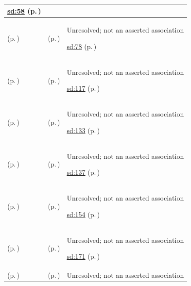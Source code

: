 \begin{longtable}{|>{\raggedright\arraybackslash}p{0.27\TableWidth}|>{\raggedright\arraybackslash}p{0.27\TableWidth}|>{\raggedright\arraybackslash}p{0.46\TableWidth}|}
 \hyperref[rad:sd:51]{sd:58} (p.\,\pageref{rad:sd:51})\\\hline
\nameref{function:route-acute-critical-result-alert} (p.\,\pageref{function:route-acute-critical-result-alert}) & \nameref{feature:feat-sd-03} (p.\,\pageref{feature:feat-sd-03}) & Unresolved; not an asserted association

 \hyperref[rad:sd:71]{sd:78} (p.\,\pageref{rad:sd:71})\\\hline
\nameref{function:assemble-inpatient-discharge-dossier} (p.\,\pageref{function:assemble-inpatient-discharge-dossier}) & \nameref{feature:feat-sd-08} (p.\,\pageref{feature:feat-sd-08}) & Unresolved; not an asserted association

 \hyperref[rad:sd:110]{sd:117} (p.\,\pageref{rad:sd:110})\\\hline
\nameref{function:receive-diagnostic-requisition-feed} (p.\,\pageref{function:receive-diagnostic-requisition-feed}) & \nameref{feature:feat-sd-09} (p.\,\pageref{feature:feat-sd-09}) & Unresolved; not an asserted association

 \hyperref[rad:sd:129]{sd:133} (p.\,\pageref{rad:sd:129})\\\hline
\nameref{function:publish-governed-diagnostic-report} (p.\,\pageref{function:publish-governed-diagnostic-report}) & \nameref{feature:feat-sd-10} (p.\,\pageref{feature:feat-sd-10}) & Unresolved; not an asserted association

 \hyperref[rad:sd:129]{sd:137} (p.\,\pageref{rad:sd:129})\\\hline
\nameref{function:correlate-adverse-reaction-allergy-profile} (p.\,\pageref{function:correlate-adverse-reaction-allergy-profile}) & \nameref{feature:feat-sd-12} (p.\,\pageref{feature:feat-sd-12}) & Unresolved; not an asserted association

 \hyperref[rad:sd:147]{sd:154} (p.\,\pageref{rad:sd:147})\\\hline
\nameref{function:project-screening-eligibility-timeline} (p.\,\pageref{function:project-screening-eligibility-timeline}) & \nameref{feature:feat-sd-14} (p.\,\pageref{feature:feat-sd-14}) & Unresolved; not an asserted association

 \hyperref[rad:sd:164]{sd:171} (p.\,\pageref{rad:sd:164})\\\hline
\nameref{function:bind-community-support-network-context} (p.\,\pageref{function:bind-community-support-network-context}) & \nameref{feature:feat-sd-16} (p.\,\pageref{feature:feat-sd-16}) & Unresolved; not an asserted association


\end{longtable}
